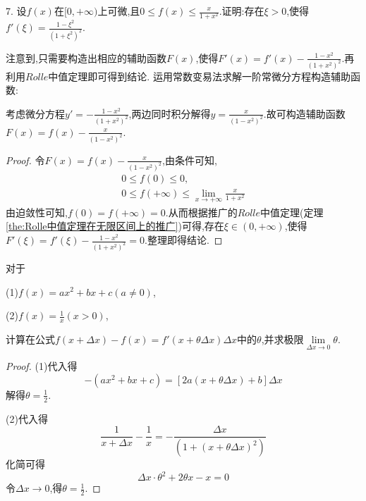 \documentclass[lang=cn,newtx,10pt,scheme=chinese]{elegantbook}
\begin{document}
\begin{exercise}
7. 设\(f(x)\)在\([0,+\infty)\)上可微,且\(0\leqslant f(x)\leqslant\frac{x}{1 + x^2}\).证明:存在\(\xi>0\),使得\(f'(\xi)=\frac{1-\xi^{2}}{(1+\xi^{2})^{2}}\).
    \begin{note}
        注意到,只需要构造出相应的辅助函数$F(x)$,使得$F'(x)=f'(x)-\frac{1-x^{2}}{(1+x^{2})^{2}}$.再利用$Rolle$中值定理即可得到结论.
        运用常数变易法求解一阶常微分方程构造辅助函数:

        考虑微分方程$y'=-\frac{1-x^{2}}{(1+x^{2})^{2}}$,两边同时积分解得$y=\frac{x}{(1-x^2)^2}$.故可构造辅助函数$F(x)=f(x)-\frac{x}{(1-x^2)^2}$.
    \end{note}
    \begin{proof}
        令$F(x)=f(x)-\frac{x}{(1-x^2)^2}$,由条件可知,
        \begin{gather}
            0\le f(0)\le 0,
            \nonumber
            \\
            0\le f(+\infty)\le \lim_{x \to +\infty} \frac{x}{1+x^2} 
            \nonumber
        \end{gather}
        由迫敛性可知,$f(0)=f(+\infty)=0$.从而根据推广的$Rolle$中值定理(定理\ref{the:Rolle中值定理在无限区间上的推广})可得,存在$\xi\in(0,+\infty)$,使得$F'(\xi)=f'(\xi)-\frac{1-x^2}{(1+x^2)^2}=0$.整理即得结论.
    \end{proof}
\end{exercise}

\begin{exercise}
对于

(1)\(f(x)=ax^2 + bx + c(a\neq0)\),

(2)\(f(x)=\frac{1}{x}(x>0)\),

计算在公式\(f(x+\Delta x)-f(x)=f'(x+\theta\Delta x)\Delta x\)中的\(\theta\),并求极限\(\lim\limits_{\Delta x\to0}\theta\).
    \begin{proof}
    (1)代入得
    \begin{equation}
    [a(x+\Delta x)^2+b(x+\Delta x)+c]-(ax^2+bx+c)=[2a(x+\theta \Delta x)+b]\Delta x
        \nonumber
    \end{equation}
    解得$\theta=\frac{1}{2}$.

    (2)代入得
    \begin{equation}
    \frac{1}{x+\Delta x}-\frac{1}{x}=-\frac{\Delta x}{(1+(x+\theta \Delta x)^2)}
        \nonumber
    \end{equation}
    化简可得
    \begin{equation}
    \Delta x\cdot\theta^2+2\theta x-x=0
        \nonumber
    \end{equation}
    令$\Delta x \to 0$,得$\theta=\frac{1}{2}$.
    \end{proof}
\end{exercise}
\end{document}
